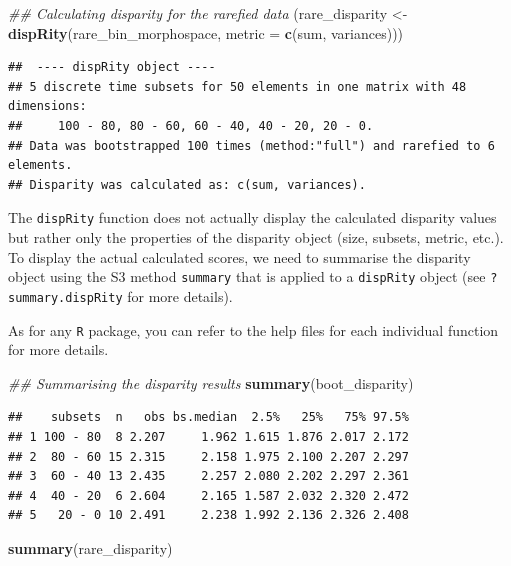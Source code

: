 \documentclass[]{book}
\newenvironment{Shaded}{\begin{snugshade}}{\end{snugshade}}
\newcommand{\CommentTok}[1]{\textcolor[rgb]{0.56,0.35,0.01}{\textit{#1}}}
\newcommand{\DataTypeTok}[1]{\textcolor[rgb]{0.13,0.29,0.53}{#1}}
\newcommand{\KeywordTok}[1]{\textcolor[rgb]{0.13,0.29,0.53}{\textbf{#1}}}
\newcommand{\NormalTok}[1]{#1}
\newcommand{\StringTok}[1]{\textcolor[rgb]{0.31,0.60,0.02}{#1}}
\begin{document}
\begin{Shaded}
\begin{Highlighting}[]
\CommentTok{## Calculating disparity for the rarefied data}
\NormalTok{(rare_disparity <-}\StringTok{ }\KeywordTok{dispRity}\NormalTok{(rare_bin_morphospace, }\DataTypeTok{metric =} \KeywordTok{c}\NormalTok{(sum, variances)))}
\end{Highlighting}
\end{Shaded}

\begin{verbatim}
##  ---- dispRity object ---- 
## 5 discrete time subsets for 50 elements in one matrix with 48 dimensions:
##     100 - 80, 80 - 60, 60 - 40, 40 - 20, 20 - 0.
## Data was bootstrapped 100 times (method:"full") and rarefied to 6 elements.
## Disparity was calculated as: c(sum, variances).
\end{verbatim}

The \texttt{dispRity} function does not actually display the calculated disparity values but rather only the properties of the disparity object (size, subsets, metric, etc.).
To display the actual calculated scores, we need to summarise the disparity object using the S3 method \texttt{summary} that is applied to a \texttt{dispRity} object (see \texttt{?summary.dispRity} for more details).

As for any \texttt{R} package, you can refer to the help files for each individual function for more details.

\begin{Shaded}
\begin{Highlighting}[]
\CommentTok{## Summarising the disparity results}
\KeywordTok{summary}\NormalTok{(boot_disparity)}
\end{Highlighting}
\end{Shaded}

\begin{verbatim}
##    subsets  n   obs bs.median  2.5%   25%   75% 97.5%
## 1 100 - 80  8 2.207     1.962 1.615 1.876 2.017 2.172
## 2  80 - 60 15 2.315     2.158 1.975 2.100 2.207 2.297
## 3  60 - 40 13 2.435     2.257 2.080 2.202 2.297 2.361
## 4  40 - 20  6 2.604     2.165 1.587 2.032 2.320 2.472
## 5   20 - 0 10 2.491     2.238 1.992 2.136 2.326 2.408
\end{verbatim}

\begin{Shaded}
\begin{Highlighting}[]
\KeywordTok{summary}\NormalTok{(rare_disparity)}
\end{Highlighting}
\end{Shaded}
\end{document}
